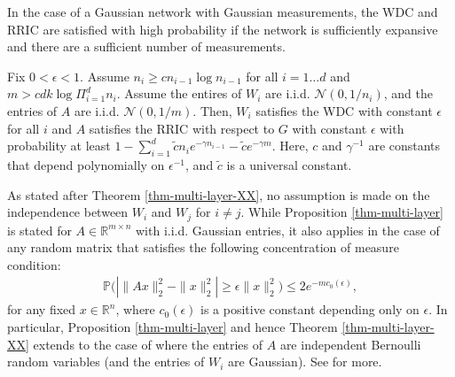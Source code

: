 \documentclass[final,12pt]{colt2018}
\newcommand{\ctilde}{\tilde{c}}
\newcommand{\R}{\mathbb{R}}
\newcommand{\eps}{\epsilon}
\newcommand{\PP}{\mathbb{P}}
\begin{document}
In the case of a Gaussian network with Gaussian measurements, the WDC and RRIC are satisfied with high probability if the network is sufficiently expansive and there are a sufficient number of measurements. 
\begin{proposition} \label{thm-multi-layer}
Fix $0 < \eps < 1$.  Assume $n_i \geq c n_{i-1} \log n_{i-1}$ for all $i = 1 \ldots d$ and $m > c d  k \log \Pi_{i=1}^d n_i$.  Assume the entires of $W_i$ are i.i.d. $\mathcal{N}(0, 1/n_i)$, and the entries of $A$ are i.i.d. $\mathcal{N}(0, 1/m)$.  
Then, $W_i$ satisfies the WDC with constant $\eps$ for all $i$ and $A$ satisfies the RRIC with respect to $G$  with constant $\eps$ with probability at least $1 -  \sum_{i=1}^d \ctilde n_i e^{-\gamma n_{i-1} }- \ctilde e^{-\gamma m}$.  Here, $c$ and $\gamma^{-1}$ are constants that depend polynomially on $\eps^{-1}$, and $\ctilde$ is a universal constant.
\end{proposition}
As stated after Theorem \ref{thm-multi-layer-XX}, no assumption is made on the independence between $W_i$ and $W_j$ for $i \neq j$.
While Proposition \ref{thm-multi-layer} is stated for $A \in \R^{m \times n}$ with i.i.d. Gaussian entries, it also applies in the case of any random matrix that satisfies the following concentration of measure condition:
\begin{align*}
\PP \bigl(| \|Ax\|_2^2  -  \|x\|_2^{2} | \geq \epsilon \|x\|_2^2 \bigr) \leq 2 e^{-m c_0(\epsilon)},
\end{align*}
for any fixed $x \in \R^n$, where $c_0(\epsilon)$ is a positive constant depending only on $\epsilon$.   In particular, Proposition \ref{thm-multi-layer} and hence Theorem \ref{thm-multi-layer-XX} extends to the case of where the entries of $A$ are independent Bernoulli random variables (and the entries of $W_i$ are Gaussian).  See \cite{Baraniuk2008} for more.  



  
\end{document}
